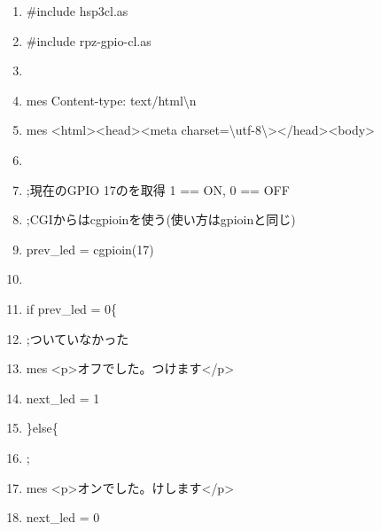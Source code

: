 \documentclass[a4paper,12pt,dvipdfmx]{jarticle}
\begin{document}
\centering
\begin{boxedminipage}{0.95\textwidth}

	\begin{enumerate}
	\baselineskip 10pt
	\setlength{\itemsep}{0cm}
	\item \#include {\textquotedbl}hsp3cl.as{\textquotedbl}

	\item \#include {\textquotedbl}rpz-gpio-cl.as{\textquotedbl}


	\item

	\item mes {\textquotedbl}Content-type: text/html{\textbackslash}n{\textquotedbl}

	\item mes {\textquotedbl}{\textless}html{\textgreater}{\textless}head{\textgreater}{\textless}meta
	charset={\textbackslash}{\textquotedbl}utf-8{\textbackslash}{\textquotedbl}{\textgreater}{\textless}/head{\textgreater}{\textless}body{\textgreater}{\textquotedbl}


	\item

	\item ;現在のGPIO 17のを取得 1 == ON, 0 == OFF

	\item ;CGIからはcgpioinを使う(使い方はgpioinと同じ)

	\item prev\_led = cgpioin(17)

	\item

	\item if prev\_led = 0\{

	\item ;ついていなかった

	\item mes
		{\textquotedbl}{\textless}p{\textgreater}オフでした。つけます{\textless}/p{\textgreater}{\textquotedbl}

	\item next\_led = 1

	\item \}else\{

	\item ;

	\item mes
		{\textquotedbl}{\textless}p{\textgreater}オンでした。けします{\textless}/p{\textgreater}{\textquotedbl}

	\item next\_led = 0


\end{enumerate}
\end{boxedminipage}
\end{document}
